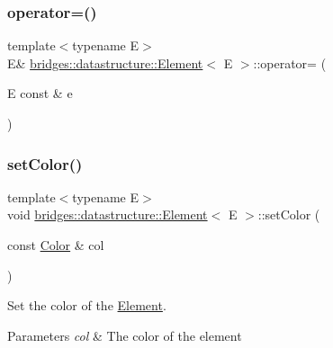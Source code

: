 \subsubsection{\texorpdfstring{operator=()}{operator=()}\hspace{0.1cm}{\footnotesize\ttfamily [2/2]}}
{\footnotesize\ttfamily template$<$typename E$>$ \\
E\& \mbox{\hyperlink{classbridges_1_1datastructure_1_1_element}{bridges\+::datastructure\+::\+Element}}$<$ E $>$\+::operator= (\begin{DoxyParamCaption}\item[{E const \&}]{e }\end{DoxyParamCaption})\hspace{0.3cm}{\ttfamily [inline]}}

\mbox{\label{classbridges_1_1datastructure_1_1_element_a17d75aae50a48b3404f3c6811c62ae1c}} 
\subsubsection{\texorpdfstring{set\+Color()}{setColor()}\hspace{0.1cm}{\footnotesize\ttfamily [1/2]}}
{\footnotesize\ttfamily template$<$typename E$>$ \\
void \mbox{\hyperlink{classbridges_1_1datastructure_1_1_element}{bridges\+::datastructure\+::\+Element}}$<$ E $>$\+::set\+Color (\begin{DoxyParamCaption}\item[{const \mbox{\hyperlink{classbridges_1_1datastructure_1_1_color}{Color}} \&}]{col }\end{DoxyParamCaption})\hspace{0.3cm}{\ttfamily [inline]}}



Set the color of the \mbox{\hyperlink{classbridges_1_1datastructure_1_1_element}{Element}}. 


\begin{DoxyParams}{Parameters}
{\em col} & The color of the element \\
\hline
\end{DoxyParams}
\mbox{\label{classbridges_1_1datastructure_1_1_element_a3792c8d514f4d644d739c6124f26bcbf}} 
